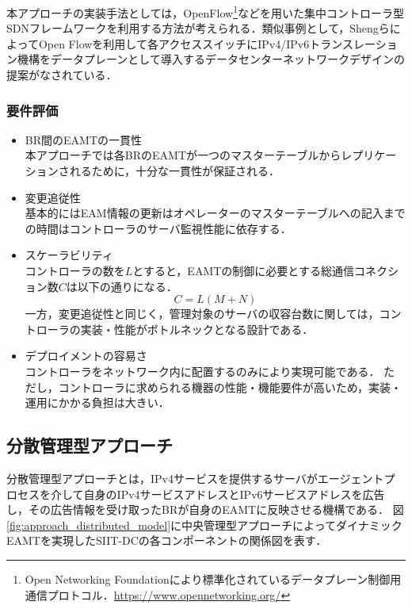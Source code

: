 本アプローチの実装手法としては，OpenFlow\footnote{Open Networking Foundationにより標準化されているデータプレーン制御用通信プロトコル．\url{https://www.opennetworking.org/}}などを用いた集中コントローラ型SDNフレームワークを利用する方法が考えられる\cite{RFC7426}．類似事例として，ShengらによってOpen Flowを利用して各アクセススイッチにIPv4/IPv6トランスレーション機構をデータプレーンとして導入するデータセンターネットワークデザインの提案がなされている\cite{7560347}．


\subsubsection{要件評価}

\begin{itemize}
    \item BR間のEAMTの一貫性 \\
    本アプローチでは各BRのEAMTが一つのマスターテーブルからレプリケーションされるために，十分な一貫性が保証される．
    \item 変更追従性 \\
    基本的にはEAM情報の更新はオペレーターのマスターテーブルへの記入までの時間はコントローラのサーバ監視性能に依存する．
    \item スケーラビリティ　\\
    コントローラの数を$L$とすると，EAMTの制御に必要とする総通信コネクション数$C$は以下の通りになる．
    \begin{equation}
        C = L(M + N)
    \end{equation}
    一方，変更追従性と同じく，管理対象のサーバの収容台数に関しては，コントローラの実装・性能がボトルネックとなる設計である．
    \item デプロイメントの容易さ　\\
    コントローラをネットワーク内に配置するのみにより実現可能である．
    ただし，コントローラに求められる機器の性能・機能要件が高いため，実装・運用にかかる負担は大きい．

\end{itemize}



\subsection{分散管理型アプローチ}
分散管理型アプローチとは，IPv4サービスを提供するサーバがエージェントプロセスを介して自身のIPv4サービスアドレスとIPv6サービスアドレスを広告し，その広告情報を受け取ったBRが自身のEAMTに反映させる機構である．
図\ref{fig:approach_distributed_model}に中央管理型アプローチによってダイナミックEAMTを実現したSIIT-DCの各コンポーネントの関係図を表す．

